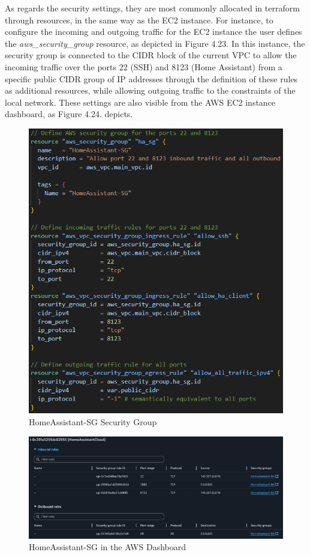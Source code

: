 As regards the security settings, they are most commonly allocated in terraform through resources, in the same way as the EC2 instance. For instance, to configure the incoming and outgoing traffic for the EC2 instance the user defines the \textit{aws\_security\_group} resource, as depicted in Figure 4.23. 
In this instance, the security group is connected to the CIDR block of the current VPC to allow the incoming traffic over the ports 22 (SSH) and 8123 (Home Assistant) from a specific public CIDR group of IP addresses through the definition of these rules as additional resources, while allowing outgoing traffic to the constraints of the local network. These settings are also visible from the AWS EC2 instance dashboard, as Figure 4.24. depicts.
\begin{figure}[H]
	\centering
	\includegraphics[width=0.8 \linewidth]{Images/K4/Picture36.png}
	\caption{HomeAssistant-SG Security Group}
	\label{fig:tf_sg}
\end{figure}

\begin{figure}[H]
	\centering
	\includegraphics[width=1 \linewidth]{Images/K4/Picture35.png}
	\caption{HomeAssistant-SG in the AWS Dashboard}
	\label{fig:tf_sg_aws}
\end{figure}

